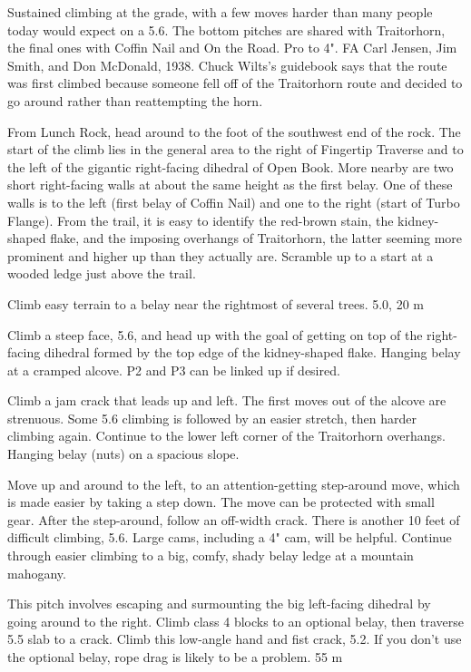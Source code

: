 \documentclass{tahquitz}
\begin{document}
Sustained climbing at the grade, with a few moves harder than many
people today would expect on a 5.6. The bottom pitches are shared with
Traitorhorn, the final ones with Coffin Nail and On the Road.  Pro
to 4".  FA Carl Jensen, Jim Smith, and Don McDonald, 1938. Chuck
Wilts's guidebook says that the route was first climbed because
someone fell off of the Traitorhorn route and decided to go around
rather than reattempting the horn. 

From Lunch Rock, head around to the foot of the southwest end of the
rock.  The start of the climb lies in the general area to the right of
Fingertip Traverse and to the left of the gigantic right-facing
dihedral of Open Book.  More nearby are two short right-facing walls
at about the same height as the first belay.  One of these walls is to
the left (first belay of Coffin Nail) and one to the right (start of
Turbo Flange).  From the trail, it is easy to identify the red-brown
stain, the kidney-shaped flake, and the imposing overhangs of
Traitorhorn, the latter seeming more prominent and higher up than they
actually are.  Scramble up to a start at a wooded ledge just above
the trail. 

\somespace

 Climb easy terrain to a belay near the rightmost of several trees. 5.0, 20 m

 Climb a steep face, 5.6, and
head up with the goal of getting on top of the right-facing
dihedral formed by the top edge of the kidney-shaped flake. Hanging belay at a
cramped alcove. P2 and P3 can be linked up if desired.

 Climb a jam crack that leads up and left. The first moves
out of the alcove are strenuous. Some 5.6 climbing is followed by an
easier stretch, then harder climbing again.  Continue to the lower
left corner of the Traitorhorn overhangs. Hanging belay (nuts) on a spacious
slope.

 Move up and around to the left, to an attention-getting step-around move,
which is made easier by taking a step down. The move can be protected with small
gear. After the step-around, follow an off-width crack.
There is another 10 feet of difficult climbing, 5.6. Large cams, including a 4" cam,
will be helpful. 
Continue through easier climbing to a big, comfy, shady belay ledge at a mountain mahogany.

 This pitch involves escaping and surmounting the big left-facing dihedral by
going around to the right. Climb class 4 blocks to an optional belay, then 
traverse 5.5 slab to a crack.
Climb this low-angle hand and fist crack, 5.2.
If you don't use the optional belay, rope drag is likely to be a problem. 55 m
\end{document}
